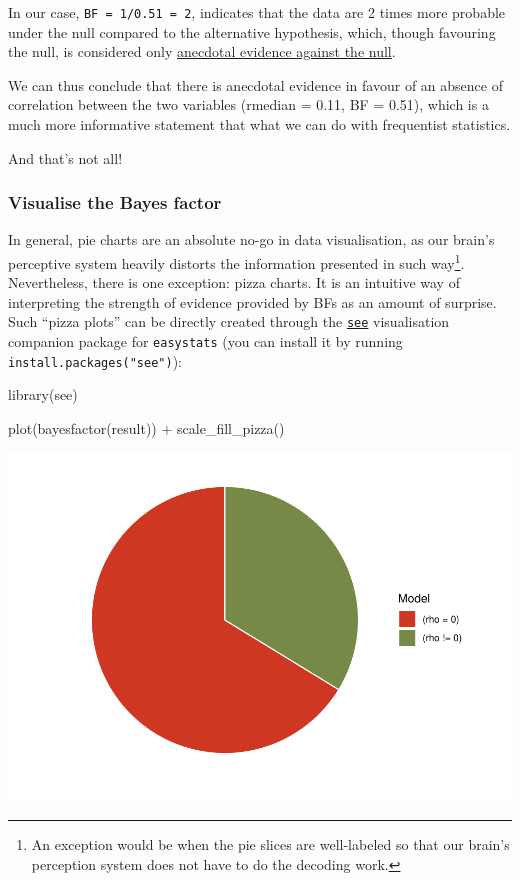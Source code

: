 \documentclass[10pt,a4paper,onecolumn]{article}
\newenvironment{Shaded}{\begin{snugshade}}{\end{snugshade}}
\newcommand{\FunctionTok}[1]{\textcolor[rgb]{0.00,0.00,0.00}{#1}}
\newcommand{\NormalTok}[1]{#1}
\newcommand{\SpecialCharTok}[1]{\textcolor[rgb]{0.00,0.00,0.00}{#1}}
\begin{document}
In our case, \texttt{BF\ =\ 1/0.51\ =\ 2}, indicates that the data are 2
times more probable under the null compared to the alternative
hypothesis, which, though favouring the null, is considered only
\href{https://easystats.github.io/effectsize/reference/interpret_bf.html}{anecdotal
evidence against the null}.

We can thus conclude that there is anecdotal evidence in favour of an
absence of correlation between the two variables (rmedian = 0.11, BF =
0.51), which is a much more informative statement that what we can do
with frequentist statistics.

And that's not all!

\hypertarget{visualise-the-bayes-factor}{%
\subsubsection{Visualise the Bayes
factor}\label{visualise-the-bayes-factor}}

In general, pie charts are an absolute no-go in data visualisation, as
our brain's perceptive system heavily distorts the information presented
in such way\footnote{An exception would be when the pie slices are
  well-labeled so that our brain's perception system does not have to do
  the decoding work.}. Nevertheless, there is one exception: pizza
charts. It is an intuitive way of interpreting the strength of evidence
provided by BFs as an amount of surprise. Such ``pizza plots'' can be
directly created through the
\href{https://github.com/easystats/see}{\texttt{see}} visualisation
companion package for \texttt{easystats} (you can install it by running
\texttt{install.packages("see")}):

\begin{Shaded}
\begin{Highlighting}[]
\FunctionTok{library}\NormalTok{(see)}

\FunctionTok{plot}\NormalTok{(}\FunctionTok{bayesfactor}\NormalTok{(result)) }\SpecialCharTok{+}
  \FunctionTok{scale\_fill\_pizza}\NormalTok{()}
\end{Highlighting}
\end{Shaded}

\includegraphics[width=1\linewidth]{paper_files/figure-latex/unnamed-chunk-35-1}
\end{document}

